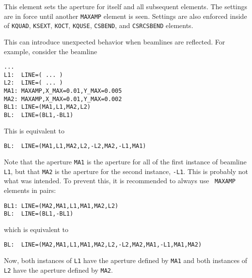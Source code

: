 This element sets the aperture for itself and all subsequent elements.
The settings are in force until another {\tt MAXAMP} element is seen.
Settings are also enforced inside of \verb|KQUAD|, \verb|KSEXT|, \verb|KOCT|, \verb|KQUSE|, \verb|CSBEND|, and \verb|CSRCSBEND| elements.

This can introduce unexpected behavior when beamlines are reflected.
For example, consider the beamline
\begin{verbatim}
...
L1:  LINE=( ... )
L2:  LINE=( ... )
MA1: MAXAMP,X_MAX=0.01,Y_MAX=0.005
MA2: MAXAMP,X_MAX=0.01,Y_MAX=0.002
BL1: LINE=(MA1,L1,MA2,L2)
BL:  LINE=(BL1,-BL1)
\end{verbatim}

This is equivalent to
\begin{verbatim}
BL:  LINE=(MA1,L1,MA2,L2,-L2,MA2,-L1,MA1)
\end{verbatim}
Note that the aperture {\tt MA1} is the aperture for all of the first
instance of beamline {\tt L1}, but that {\tt MA2} is the aperture for
the second instance, {\tt -L1}.  This is probably not what was
intended.  To prevent this, it is recommended to always use {\tt
MAXAMP} elements in pairs:
\begin{verbatim}
BL1: LINE=(MA2,MA1,L1,MA1,MA2,L2)
BL:  LINE=(BL1,-BL1)
\end{verbatim}
which is equivalent to
\begin{verbatim}
BL:  LINE=(MA2,MA1,L1,MA1,MA2,L2,-L2,MA2,MA1,-L1,MA1,MA2)
\end{verbatim}
Now, both instances of {\tt L1} have the aperture defined by 
{\tt MA1} and both instances of {\tt L2} have the aperture defined
by {\tt MA2}.

